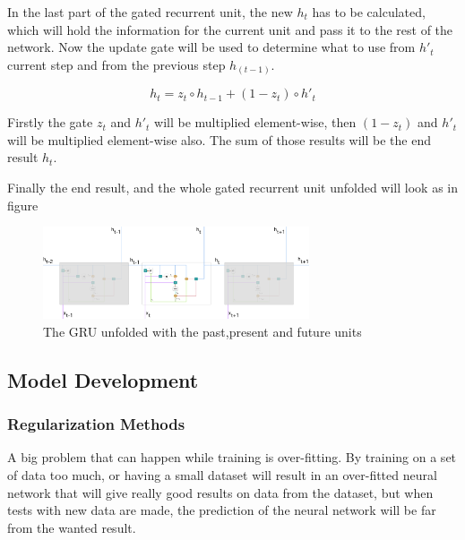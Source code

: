 In the last part of the gated recurrent unit, the new $h_t$ has to be calculated, which will hold the information for the current unit and pass it to the rest of the network.
Now the update gate will be used to determine what to use from $h'_t$ current step and from the previous step $h_{(t-1)}$.

\begin{equation}
h_t=z_t \circ h_{t-1}+(1-z_t) \circ h'_t
\end{equation}

Firstly the gate $z_t$ and $h'_t$ will be multiplied element-wise, then $(1-z_t)$ and $h'_t$ will be multiplied element-wise also. The sum of those results will be the end result $h_t$. 

Finally the end result, and the whole gated recurrent unit unfolded will look as in figure 

\begin{figure}[htp]
	\centering
	\includegraphics[width=0.7\textwidth]{Illustrations/GRUunfolded.png}
	\caption{The GRU unfolded with the past,present and future units}
	\label{fig:GRUunfolded}
\end{figure}

\subsection{Model Development}

\subsubsection{Regularization Methods}
A big problem that can happen while training is over-fitting. By training on a set of data too much, or having a small dataset will result in an over-fitted neural network that will give really good results on data from the dataset, but when tests with new data are made, the prediction of the neural network will be far from the wanted result.
 
